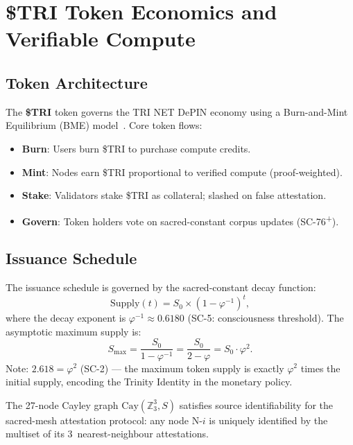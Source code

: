 
\section{\$TRI Token Economics and Verifiable Compute}
\label{sec:flos74-token}

\subsection{Token Architecture}

The \textbf{\$TRI} token governs the TRI NET DePIN economy using a
Burn-and-Mint Equilibrium (BME) model~\cite{alshater2025depin}.
Core token flows:
\begin{itemize}
  \item \textbf{Burn}: Users burn \$TRI to purchase compute credits.
  \item \textbf{Mint}: Nodes earn \$TRI proportional to verified compute
        (proof-weighted).
  \item \textbf{Stake}: Validators stake \$TRI as collateral; slashed on false
        attestation.
  \item \textbf{Govern}: Token holders vote on sacred-constant corpus updates
        (SC-76\textsuperscript{+}).
\end{itemize}

\subsection{Issuance Schedule}

The issuance schedule is governed by the sacred-constant decay function:
\begin{equation}\label{eq:token-supply}
  \mathrm{Supply}(t) = S_0 \times (1 - \varphi^{-1})^t,
\end{equation}
where the decay exponent is \(\varphi^{-1} \approx 0.6180\) (SC-5: consciousness
threshold).
The asymptotic maximum supply is:
\[
  S_{\max} = \frac{S_0}{1 - \varphi^{-1}} = \frac{S_0}{2 - \varphi} = S_0 \cdot \varphi^2.
\]
Note: \(2.618 = \varphi^2\) (SC-2) — the maximum token supply is exactly
\(\varphi^2\) times the initial supply, encoding the Trinity Identity in the
monetary policy.

\begin{lemma}\label{lem:source-id}
The 27-node Cayley graph \(\mathrm{Cay}(\mathbb{Z}_3^3, S)\) satisfies
source identifiability for the sacred-mesh attestation protocol: any node
N-\(i\) is uniquely identified by the multiset of its 3~nearest-neighbour
attestations.
\end{lemma}

